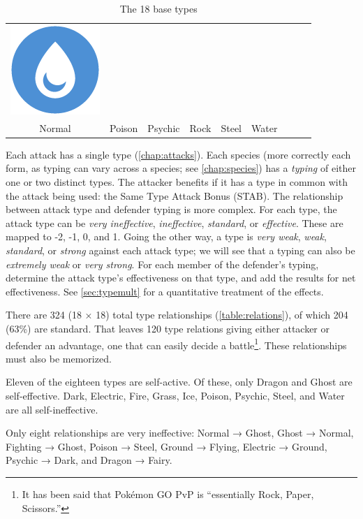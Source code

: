 \begin{table}[ht!]
\begin{tabular}{c c c c c c c c c}
\includegraphics[scale=.25]{images/water.png} \\
Normal & Poison & Psychic & Rock & Steel & Water \\
\end{tabular}
\caption{The 18 base types\label{table:basetypes}}
\end{table}

Each attack has a single type (\autoref{chap:attacks}).
Each species (more correctly each form, as typing can vary across a species; see \autoref{chap:species})
  has a \textit{typing} of either one or two distinct types.
The attacker benefits if it has a type in common with the attack being used:
  the Same Type Attack Bonus (STAB).
The relationship between attack type and defender typing is more complex.
For each type, the attack type can be \textit{very ineffective},
  \textit{ineffective}, \textit{standard}, or \textit{effective}.
These are mapped to -2, -1, 0, and 1.
Going the other way, a type is \textit{very weak}, \textit{weak},
  \textit{standard}, or \textit{strong} against each attack type;
  we will see that a typing can also be \textit{extremely weak} or
  \textit{very strong}.
For each member of the defender's typing, determine the attack type's effectiveness
  on that type, and add the results for net effectiveness.
See \autoref{sec:typemult} for a quantitative treatment of the effects.

There are 324 (18 × 18) total type relationships (\autoref{table:relations}),
  of which 204 (63\%) are standard.
That leaves 120 type relations giving either attacker or defender an advantage,
  one that can easily decide a battle\footnote{It has been said that Pokémon GO PvP is ``essentially Rock, Paper, Scissors.''}.
These relationships must also be memorized.



Eleven of the eighteen types are self-active.
Of these, only Dragon and Ghost are self-effective.
Dark, Electric, Fire, Grass, Ice, Poison, Psychic, Steel, and Water are all self-ineffective.%

Only eight relationships are very ineffective:
Normal → Ghost,
Ghost → Normal,
Fighting → Ghost,
Poison → Steel,
Ground → Flying,
Electric → Ground,
Psychic → Dark,
and Dragon → Fairy.

